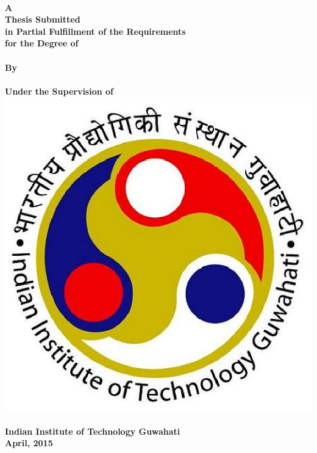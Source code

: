 \documentclass[11pt, a4paper, twoside]{Thesis} %
\begin{document}
\begin{titlepage}
\begin{center}

{\bfseries \fontsize{18}{19}\selectfont{\thesisTitle}}\\[1.5cm]


\large \textbf{A} \\ \textbf{Thesis Submitted} \\ \textbf{in Partial Fulfillment of the Requirements} \\ \textbf{for the Degree of} \\ \textbf{\expandafter\uppercase\expandafter{\degreeName}} \\ \textbf{By} \\ [1.5cm] \textbf{\expandafter\uppercase\expandafter{\authorName}}\\  \textbf{Under the Supervision of \supervisorTitle \ \expandafter\uppercase\expandafter{\supervisorName}} \\[1.5cm] %



\includegraphics[scale=0.4]{Images/iitglogo} \\ [3cm]



\large \textbf{\departmentName} \\ \textbf{Indian Institute of Technology Guwahati} \\  \textbf{April, 2015}\\ [0.3cm]


\end{center}



\end{titlepage}
\end{document}
